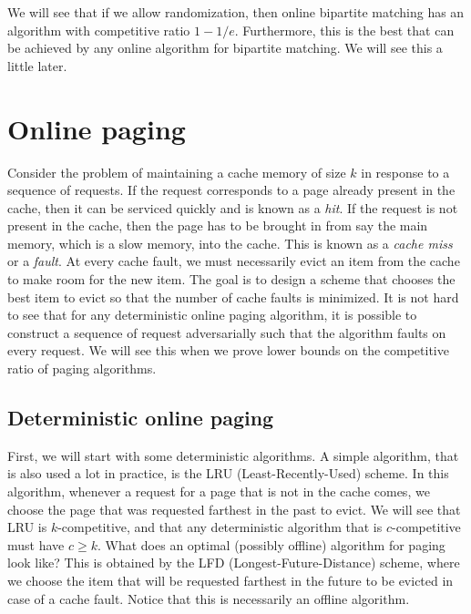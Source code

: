 We will see that if we allow randomization, then online bipartite matching has an algorithm with competitive ratio $1 - 1/e$. Furthermore, this is the best that can be achieved by any online algorithm for bipartite matching. We will see this a little later.

\section{Online paging}

Consider the problem of maintaining a cache memory of size $k$ in response to a sequence of requests. If the request corresponds to a page already present in the cache, then it can be serviced quickly and is known as a \emph{hit}. If the request is not present in the cache, then the page has to be brought in from say the main memory, which is a slow memory, into the cache. This is known as a \emph{cache miss} or a \emph{fault}. At every cache fault, we must necessarily evict an item from the cache to make room for the new item. The goal is to design a scheme that chooses the best item to evict so that the number of cache faults is minimized. It is not hard to see that for any deterministic online paging algorithm, it is possible to construct a sequence of request adversarially such that the algorithm faults on every request. We will see this when we prove lower bounds on the competitive ratio of paging algorithms.

\subsection{Deterministic online paging}
First, we will start with some deterministic algorithms. A simple algorithm, that is also used a lot in practice, is the LRU (Least-Recently-Used) scheme. In this algorithm, whenever a request for a page that is not in the cache comes, we choose the page that was requested farthest in the past to evict. We will see that LRU is $k$-competitive, and that any deterministic algorithm that is $c$-competitive must have $c \geq k$. What does an optimal (possibly offline) algorithm for paging look like? This is obtained by the LFD (Longest-Future-Distance) scheme, where we choose the item that will be requested farthest in the future to be evicted in case of a cache fault. Notice that this is necessarily an offline algorithm.

